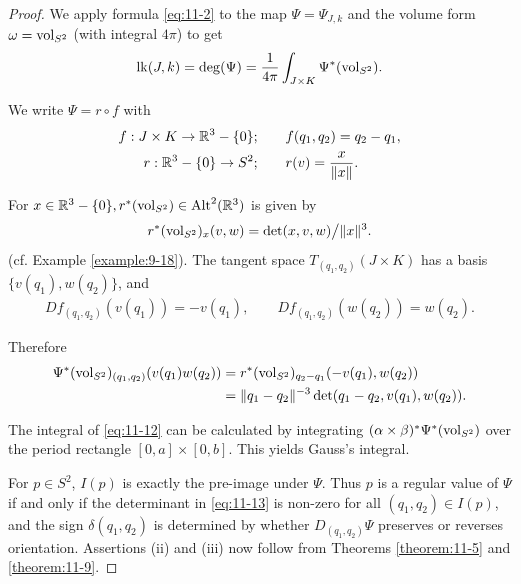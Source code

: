\begin{proof}
  We apply formula \eqref{eq:11-2} to the map $\Psi = \Psi_{J, k}$ and the volume form
$\omega = \mathrm{vol}_{S^2}$ (with integral $4\pi$) to get
\begin{align}\label{eq:11-12}
  \mathrm{lk}(J, k) = \mathrm{deg}(\Psi) = \frac{1}{4\pi}\int_{J\times K}\Psi^*(\mathrm{vol}_{S^2}).
\end{align}

We write $\Psi = r\circ f$ with 
\begin{align*}
  f:J\times K\to {\ensuremath{\mathbb{R}}}^3 - \{0\};& \qquad f(q_1, q_2) = q_2 - q_1, \\
  r:{\mathbb{R}}^3 - \{0\}\to S^2;& \qquad r(v) = \frac{x}{\|x\|}.
\end{align*}

For $x\in{\ensuremath{\mathbb{R}}}^3-\{0\}, r^*(\mathrm{vol}_{S^2})\in\operatorname{Alt}^2({\mathbb{R}}^3)$ is given by 
\begin{align*}
  r^*(\mathrm{vol}_{S^2})_x(v, w) = \det(x, v, w)\big/ \|x\|^3.
\end{align*}
(cf. Example \ref{example:9-18}). The tangent space $T_{(q_1, q_2)}(J\times K)$ has a basis 
$\{v(q_1), w(q_2)\}$, and
\begin{align*}
  Df_{(q_1, q_2)}(v(q_1)) = - v(q_1), \qquad Df_{(q_1, q_2)}(w(q_2)) = w(q_2).
\end{align*}

Therefore 
\begin{align}\label{eq:11-13}
  \Psi^*(\mathrm{vol}_{S^2})_{(q_1, q_2)}(v(q_1)w(q_2)) 
  & = r^*(\mathrm{vol}_{S^2})_{q_2-q_1}(-v(q_1), w(q_2))\\
  & = \|q_1 - q_2\|^{-3}\det(q_1 - q_2, v(q_1), w(q_2)).\notag
\end{align}

The integral of \eqref{eq:11-12} can be calculated by integrating $(\alpha\times\beta)^*\Psi^*(\mathrm{vol}_{S^2})$ over 
the period rectangle $[0, a]\times [0, b]$. This yields Gauss's integral.

For $p\in S^2$, $I(p)$ is exactly the pre-image under $\Psi$. Thus $p$ is a regular value
of $\Psi$ if and only if the determinant in \eqref{eq:11-13} is non-zero for all $(q_1, q_2)\in I(p)$,
and the sign $\delta(q_1, q_2)$ is determined by whether $D_{(q_1, q_2)}\Psi$ preserves or reverses
orientation. Assertions (ii) and (iii) now follow from Theorems \ref{theorem:11-5} and \ref{theorem:11-9}. 
\end{proof}

